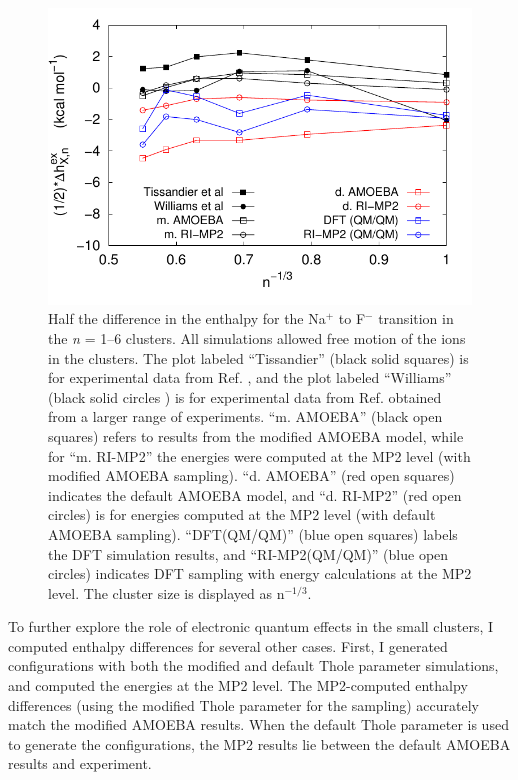 \begin{cpa}
\begin{figure}
 \begin{center}
  \includegraphics[width=0.98\linewidth]{images/cpa/deltaH_exptl_range-eps-converted-to.pdf}
 \end{center}
\caption[Half the enthalpy differences in the Na\sur{+}$\rightarrow$F\sur{-} transition for small clusters]{Half the difference in the enthalpy for the Na$^+$ to 
F$^-$ transition in the \emph{n} = 1--6 clusters. All simulations allowed free motion of the ions in the clusters. The plot labeled ``Tissandier'' (black solid squares) is 
for experimental data from Ref. \cite{coe1998cpa1}, and the plot labeled ``Williams'' (black solid circles ) is for experimental data from Ref.
\cite{donald2010expand_cpa} obtained from a larger range of experiments. ``m. AMOEBA'' (black open squares) refers to results from the modified AMOEBA model, while 
for ``m. RI-MP2'' the energies were computed at the MP2 level (with modified AMOEBA sampling). ``d. AMOEBA'' (red open squares) indicates the default AMOEBA model, 
and ``d. RI-MP2'' (red open circles) is for energies computed at the MP2 level (with default AMOEBA sampling). ``DFT(QM/QM)'' (blue open squares) labels the DFT
simulation results, and ``RI-MP2(QM/QM)'' (blue open circles) indicates DFT sampling with energy calculations at the MP2 level. The cluster size is displayed as 
n$^{-1/3}$.}
\label{fig:dHexptsmall}
\end{figure}

  To further explore the role of electronic quantum effects in the small clusters, I computed enthalpy differences for several other cases. First, I generated
  configurations with both the modified and default Thole parameter simulations, and computed the energies at the MP2 level. The MP2-computed enthalpy differences
  (using the modified Thole parameter for the sampling) accurately match the modified AMOEBA results. When the default Thole parameter is used to generate the
  configurations, the MP2 results lie between the default AMOEBA results and experiment. 
  

\end{cpa}
